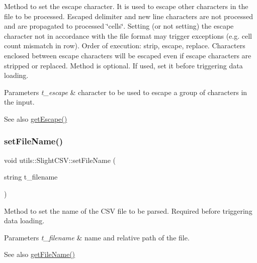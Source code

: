 Method to set the escape character. It is used to escape other characters in the file to be processed. Escaped delimiter and new line characters are not processed and are propagated to processed \char`\"{}cells\char`\"{}. Setting (or not setting) the escape character not in accordance with the file format may trigger exceptions (e.\+g. cell count mismatch in row). Order of execution\+: strip, escape, replace. Characters enclosed between escape characters will be escaped even if escape characters are stripped or replaced. Method is optional. If used, set it before triggering data loading. 
\begin{DoxyParams}{Parameters}
{\em t\+\_\+escape} & character to be used to escape a group of characters in the input. \\
\hline
\end{DoxyParams}
\begin{DoxySeeAlso}{See also}
\hyperlink{classutils_1_1SlightCSV_ab821a07daafa1ccaf8468ac485b226b0}{get\+Escape()} 
\end{DoxySeeAlso}
\mbox{\label{classutils_1_1SlightCSV_a9567504e450440a9564053c8ab6f6ff9}} 
\subsubsection{\texorpdfstring{set\+File\+Name()}{setFileName()}}
{\footnotesize\ttfamily void utils\+::\+Slight\+C\+S\+V\+::set\+File\+Name (\begin{DoxyParamCaption}\item[{string}]{t\+\_\+filename }\end{DoxyParamCaption})}

Method to set the name of the C\+SV file to be parsed. Required before triggering data loading. 
\begin{DoxyParams}{Parameters}
{\em t\+\_\+filename} & name and relative path of the file. \\
\hline
\end{DoxyParams}
\begin{DoxySeeAlso}{See also}
\hyperlink{classutils_1_1SlightCSV_ad689937346e0d6dd37597e7c3458e164}{get\+File\+Name()} 
\end{DoxySeeAlso}
\mbox{\label{classutils_1_1SlightCSV_a3d704d8bbce22b1731e383db4fc96429}} 
